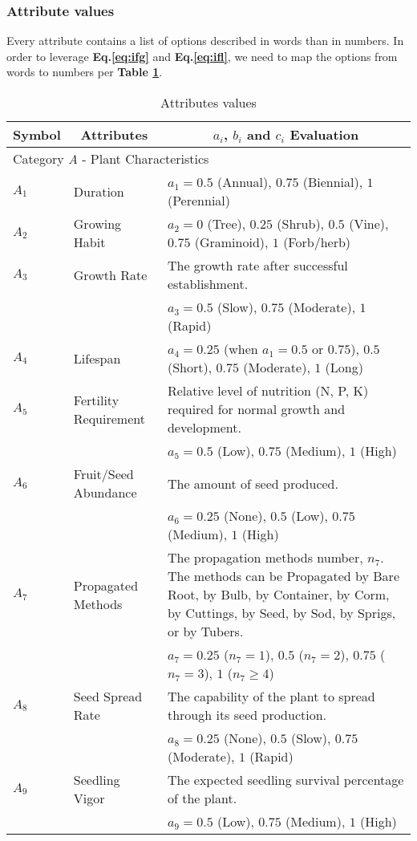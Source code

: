 \documentclass[12pt]{article}
\begin{document}
		\subsubsection{Attribute values}
		\label{sec:attr_value}
		
		Every attribute contains a list of options described in words than in numbers.  In order to leverage \textbf{Eq.\ref{eq:ifg}} and \textbf{Eq.\ref{eq:ifl}}, we need to map the options from words to numbers per \textbf{Table \ref{tb:attributes}}.
		\newpage
		{
			\fontsize{10}{14}\selectfont
			{
			\begin{longtable}{p{0.2in}p{1.5in}p{4.3in}}
				
				\caption{Attributes values}
				\label{tb:attributes}\\
				
				\toprule
				\multicolumn{1}{c}{\textbf{Symbol}} 
					& \multicolumn{1}{c}{\textbf{Attributes}}
					& \multicolumn{1}{c}{\textbf{$a_i$, $b_i$ and $c_i$ Evaluation}} \\
			
				\toprule
				\multicolumn{3}{l}{Category \textit{A} - Plant Characteristics}\\
				\midrule
				
				$A_1$ & Duration & $a_1=0.5$ (Annual), $0.75$ (Biennial), $1$ (Perennial)\\
				$A_2$ & Growing Habit & $a_2=0$ (Tree), $0.25$ (Shrub), $0.5$ (Vine), $0.75$ (Graminoid), $1$ (Forb/herb)\\ 
				$A_3$ & Growth Rate & The growth rate after successful establishment.\\
					&& $a_3=0.5$ (Slow), $0.75$ (Moderate), $1$ (Rapid)\\
				$A_4$ & Lifespan & $a_4=0.25$ (when $a_1=0.5$ or $0.75$), $0.5$ (Short), $0.75$ (Moderate), $1$ (Long) \\
				$A_5$ & Fertility Requirement & Relative level of nutrition (N, P, K) required for normal growth and development.\\
					 && $a_5=0.5$ (Low), $0.75$ (Medium), $1$ (High)\\
				$A_6$ & Fruit/Seed Abundance & The amount of seed produced.\\
					&& $a_6=0.25$ (None), $0.5$ (Low), $0.75$ (Medium), $1$ (High)\\
				$A_7$ & Propagated Methods & The propagation methods number, $n_7$. The methods can be Propagated by Bare Root, by Bulb, by Container, by Corm, by Cuttings, by Seed, by Sod, by Sprigs, or by Tubers. \\
					&& $a_7=0.25$ ($n_7=1$), $0.5$ ($n_7=2$), $0.75$ ($n_7=3$), $1$ ($n_7\geq4$)\\
				$A_8$ & Seed Spread Rate & The capability of the plant to spread through its seed production.\\
					&& $a_8=0.25$ (None), $0.5$ (Slow), $0.75$ (Moderate), $1$ (Rapid)\\
				$A_9$ & Seedling Vigor & The expected seedling survival percentage of the plant.\\
					&& $a_9=0.5$ (Low), $0.75$ (Medium), $1$ (High)\\
				

\end{longtable}}}
\end{document}
